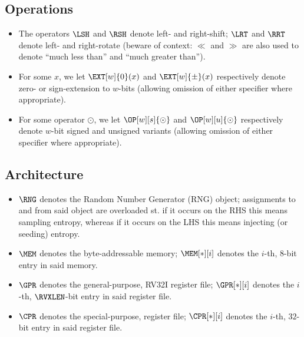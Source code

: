 
\subsection{Operations}

\begin{itemize}

\item The operators $\LSH$ and $\RSH$ denote left- and right-shift; $\LRT$ and
      $\RRT$ denote left- and right-rotate (beware of context: $\ll$ and $\gg$
      are also used to denote ``much less than'' and ``much greater than'').
\item For some $x$, 
      we let
      $\EXT[w]{0  }( x )$
      and
      $\EXT[w]{\pm}( x )$
      respectively denote
      zero- or sign-extension to $w$-bits
      (allowing omission of either specifier where appropriate).
\item For some operator $\odot$, 
      we let
      $\OP[w][s]{\odot}$
      and 
      $\OP[w][u]{\odot}$
      respectively denote 
      $w$-bit signed and unsigned variants
      (allowing omission of either specifier where appropriate).

\end{itemize}


\subsection{Architecture}

\begin{itemize}

\item $\RNG$
      denotes the Random Number Generator (RNG) object;
      assignments to and from said object are overloaded st. if
      it occurs on the RHS this means sampling               entropy,
      whereas if
      it occurs on the LHS this means injecting (or seeding) entropy.
\item $\MEM$
      denotes the byte-addressable memory;
      $\MEM[*][i]$ 
      denotes the $i$-th,
            $8$-bit 
      entry in said memory.
\item $\GPR$ 
      denotes the 
      general-purpose, RV32I register file;
      $\GPR[*][i]$ 
      denotes the $i$-th,
      $\RVXLEN$-bit
      entry in said register file.
\item $\CPR$ 
      denotes the 
      special-purpose, \XCID register file;
      $\CPR[*][i]$ 
      denotes the $i$-th,
           $32$-bit 
      entry in said register file.

\end{itemize}

